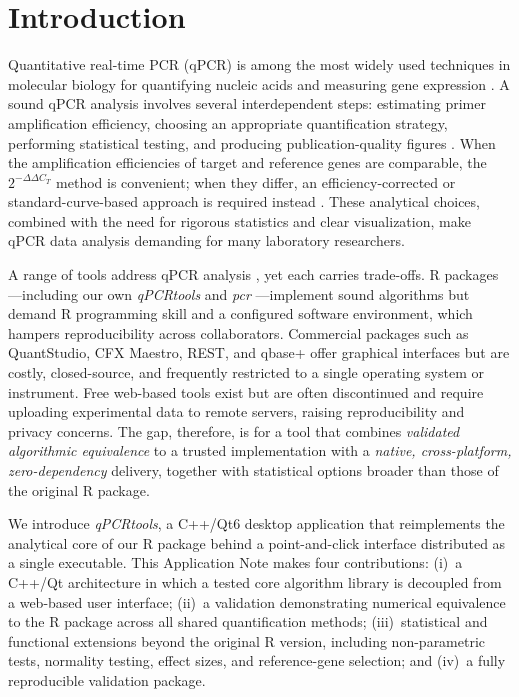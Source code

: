 \section{Introduction}

Quantitative real-time PCR (qPCR) is among the most widely used techniques
in molecular biology for quantifying nucleic acids and measuring gene
expression \cite{bustin2009miqe}. A sound qPCR analysis involves several
interdependent steps: estimating primer amplification efficiency, choosing an
appropriate quantification strategy, performing statistical testing, and
producing publication-quality figures \cite{bustin2010miqe}. When the
amplification efficiencies of target and reference genes are comparable, the
$2^{-\Delta\Delta C_T}$ method \cite{livak2001analysis} is convenient; when
they differ, an efficiency-corrected or standard-curve-based approach is
required instead \cite{pfaffl2001new}. These analytical choices, combined
with the need for rigorous statistics and clear visualization, make qPCR
data analysis demanding for many laboratory researchers.

A range of tools address qPCR analysis \cite{pabinger2014survey}, yet each
carries trade-offs. R packages---including our own \textit{qPCRtools}
\cite{li2022qpcrtools} and \textit{pcr} \cite{ahmed2018pcr}---implement sound
algorithms but demand R programming skill and a configured software
environment, which hampers reproducibility across collaborators. Commercial
packages such as QuantStudio, CFX Maestro, REST, and qbase+ offer graphical
interfaces but are costly, closed-source, and frequently restricted to a
single operating system or instrument. Free web-based tools exist but are
often discontinued and require uploading experimental data to remote
servers, raising reproducibility and privacy concerns. The gap, therefore,
is for a tool that combines \emph{validated algorithmic equivalence} to a
trusted implementation with a \emph{native, cross-platform, zero-dependency}
delivery, together with statistical options broader than those of the
original R package.

We introduce \textit{qPCRtools}, a C++/Qt6 desktop application that
reimplements the analytical core of our R package behind a point-and-click
interface distributed as a single executable. This Application Note makes
four contributions: (i)~a C++/Qt architecture in which a tested core
algorithm library is decoupled from a web-based user interface; (ii)~a
validation demonstrating numerical equivalence to the R package across all
shared quantification methods; (iii)~statistical and functional extensions
beyond the original R version, including non-parametric tests, normality
testing, effect sizes, and reference-gene selection; and (iv)~a fully
reproducible validation package.
